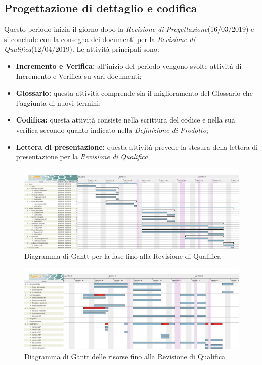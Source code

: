 \subsection{Progettazione di dettaglio e codifica}
Questo periodo inizia il giorno dopo la \textit{Revisione di Progettazione}(16/03/2019) e si conclude
con la consegna dei documenti per la \textit{Revisione di Qualifica}(12/04/2019). Le attività principali sono:
\begin{itemize}
	\item{\textbf{Incremento e Verifica:} all’inizio del periodo vengono svolte attività di Incremento e Verifica su vari documenti;}
	\item{\textbf{Glossario:} questa attività comprende sia il miglioramento del Glossario che l’aggiunta di nuovi termini;}
	\item{\textbf{Codifica:} questa attività consiste nella scrittura del codice e nella sua verifica secondo quanto indicato nella \textit{Definizione di Prodotto};}
	\item{\textbf{Lettera di presentazione:} questa attività prevede la stesura della lettera
		di presentazione per la \textit{Revisione di Qualifica}.}
\end{itemize}

\begin{figure}[h!]
	\centering
	\includegraphics[width=\textwidth]{Gantt_terza_fase.jpg}
	\caption{Diagramma di Gantt per la fase fino alla Revisione di Qualifica}
\end{figure}

\begin{figure}[h!]
	\centering
	\includegraphics[width=\textwidth]{Gantt_terza_fase_risorse.jpg}
	\caption{Diagramma di Gantt delle risorse fino alla Revisione di Qualifica}
\end{figure}

